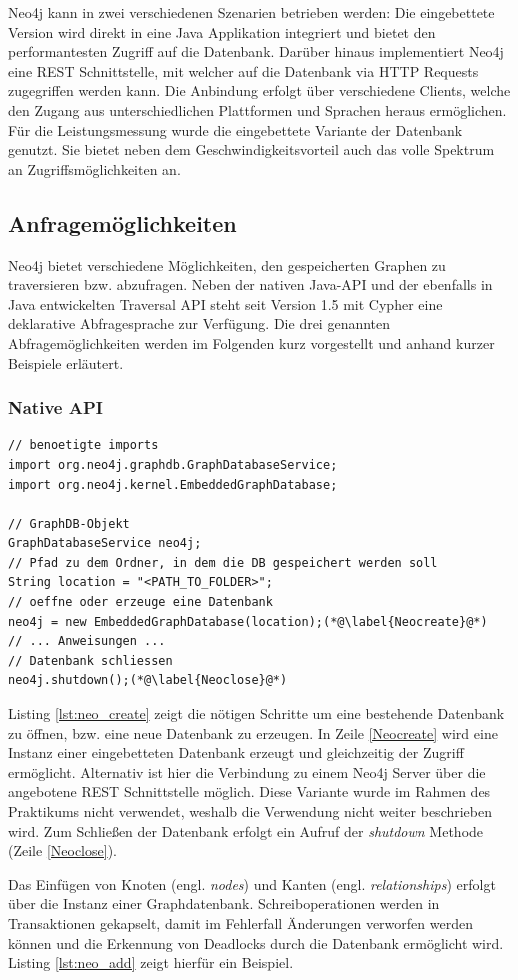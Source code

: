 \documentclass[11pt, a4paper, oneside]{article} %
\begin{document}
Neo4j kann in zwei verschiedenen Szenarien betrieben werden: Die eingebettete Version wird direkt in eine Java Applikation integriert und bietet den performantesten Zugriff auf die Datenbank. Darüber hinaus implementiert Neo4j eine REST Schnittstelle, mit welcher auf die Datenbank via HTTP Requests zugegriffen werden kann. Die Anbindung erfolgt über verschiedene Clients, welche den Zugang aus unterschiedlichen Plattformen und Sprachen heraus ermöglichen.\\
Für die Leistungsmessung wurde die eingebettete Variante der Datenbank genutzt. Sie bietet neben dem Geschwindigkeitsvorteil auch das volle Spektrum an Zugriffsmöglichkeiten an.

\subsection{Anfragemöglichkeiten}

Neo4j bietet verschiedene Möglichkeiten, den gespeicherten Graphen zu traversieren bzw. abzufragen. Neben der nativen Java-API und der ebenfalls in Java entwickelten Traversal API steht seit Version 1.5 mit Cypher eine deklarative Abfragesprache zur Verfügung. Die drei genannten Abfragemöglichkeiten werden im Folgenden kurz vorgestellt und anhand kurzer Beispiele erläutert.
\newpage
\subsubsection{Native API}

\begin{lstlisting}[caption={Erstellen, Öffnen und Schließen einer Datenbank},label={lst:neo_create}]
// benoetigte imports
import org.neo4j.graphdb.GraphDatabaseService;
import org.neo4j.kernel.EmbeddedGraphDatabase;

// GraphDB-Objekt
GraphDatabaseService neo4j;
// Pfad zu dem Ordner, in dem die DB gespeichert werden soll
String location = "<PATH_TO_FOLDER>";
// oeffne oder erzeuge eine Datenbank
neo4j = new EmbeddedGraphDatabase(location);(*@\label{Neocreate}@*)
// ... Anweisungen ...
// Datenbank schliessen
neo4j.shutdown();(*@\label{Neoclose}@*)
\end{lstlisting}

Listing \ref{lst:neo_create} zeigt die nötigen Schritte um eine bestehende Datenbank zu öffnen, bzw. eine neue Datenbank zu erzeugen. In Zeile \ref{Neocreate} wird eine Instanz einer eingebetteten Datenbank erzeugt und gleichzeitig der Zugriff ermöglicht. Alternativ ist hier die Verbindung zu einem Neo4j Server über die angebotene REST Schnittstelle möglich. Diese Variante wurde im Rahmen des Praktikums nicht verwendet, weshalb die Verwendung nicht weiter beschrieben wird. Zum Schließen der Datenbank erfolgt ein Aufruf der \textit{shutdown} Methode (Zeile \ref{Neoclose}).
\par
Das Einfügen von Knoten (engl. \textit{nodes}) und Kanten (engl. \textit{relationships}) erfolgt über die Instanz einer Graphdatenbank. Schreiboperationen werden in Transaktionen gekapselt, damit im Fehlerfall Änderungen verworfen werden können und die Erkennung von Deadlocks durch die Datenbank ermöglicht wird. Listing \ref{lst:neo_add} zeigt hierfür ein Beispiel.
\end{document}
